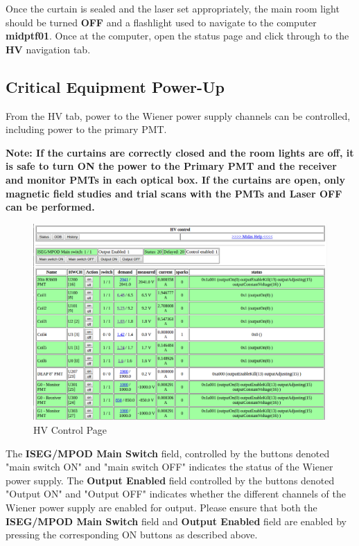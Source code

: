 \documentclass[twoside,letterpaper]{refart}
\begin{document}
Once the curtain is sealed and the laser set appropriately, the main room light should be turned \textbf{OFF} and a flashlight used to navigate to the computer \textbf{midptf01}. Once at the computer, open the status page and click through to the \textbf{HV} navigation tab.

\clearpage

\subsection{Critical Equipment Power-Up} \label{PowerUP}

From the HV tab, power to the Wiener power supply channels can be controlled, including power to the primary PMT.  

\textbf{Note: If the curtains are correctly closed and the room lights are off, it is safe to turn ON the power to the Primary PMT and the receiver and monitor PMTs in each optical box.  If the curtains are open, only magnetic field studies and trial scans with the PMTs and Laser OFF can be performed.}

\FloatBarrier

\begin{figure}[!htpb] 
	\centering	
	\includegraphics[scale=0.29]{images/HVPage}
	\caption{HV Control Page}
	\label{HVPage}
\end{figure}

\FloatBarrier

The \textbf{ISEG/MPOD Main Switch} field, controlled by the buttons denoted "main switch ON" and "main switch OFF" indicates the status of the Wiener power supply. The \textbf{Output Enabled} field controlled by the buttons denoted "Output ON" and "Output OFF" indicates whether the different channels of the Wiener power supply are enabled for output.  Please ensure that both the \textbf{ISEG/MPOD Main Switch} field and \textbf{Output Enabled} field are enabled by pressing the corresponding ON buttons as described above. 
\end{document}
